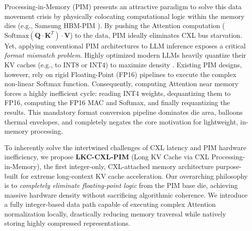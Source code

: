 \documentclass[10pt,conference]{IEEEtran}
\begin{document}
Processing-in-Memory (PIM) presents an attractive paradigm to solve this data movement crisis by physically colocating computational logic within the memory dies (e.g., Samsung HBM-PIM \cite{samsung_pim}). By pushing the Attention computation ($\text{Softmax}(\mathbf{Q} \cdot \mathbf{K}^T) \cdot \mathbf{V}$) to the data, PIM ideally eliminates CXL bus starvation. Yet, applying conventional PIM architectures to LLM inference exposes a critical \textit{format mismatch problem}. Highly optimized modern LLMs heavily quantize their KV caches (e.g., to INT8 or INT4) to maximize density \cite{llm_outliers}. Existing PIM designs, however, rely on rigid Floating-Point (FP16) pipelines to execute the complex non-linear Softmax function. Consequently, computing Attention near memory forces a highly inefficient cycle: reading INT4 weights, dequantizing them to FP16, computing the FP16 MAC and Softmax, and finally requantizing the results. This mandatory format conversion pipeline dominates die area, balloons thermal envelopes, and completely negates the core motivation for lightweight, in-memory processing.

To inherently solve the intertwined challenges of CXL latency and PIM hardware inefficiency, we propose \textbf{LKC-CXL-PIM} (Long KV Cache via CXL Processing-in-Memory), the first integer-only, CXL-attached memory architecture purpose-built for extreme long-context KV cache acceleration. Our overarching philosophy is to \textit{completely eliminate floating-point logic} from the PIM base die, achieving massive hardware density without sacrificing algorithmic coherence. We introduce a fully integer-based data path capable of executing complex Attention normalization locally, drastically reducing memory traversal while natively storing highly compressed representations.
\end{document}
